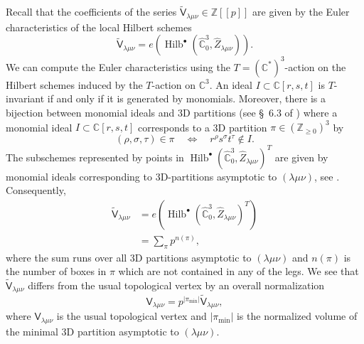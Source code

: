 \documentclass[12pt]{amsart}
\theoremstyle{definition}
\newcommand{\CC} {\mathbb{C}}          %
\newcommand{\ZZ} {\mathbb{Z}}		%
\newcommand{\sfV}{\mathsf{V}}
\newcommand{\sfVtilde}{\widetilde{\mathsf{V}}}
\newcommand{\Hilb}{\operatorname{Hilb}}
\renewcommand{\hat}{\widehat}
\begin{document}
Recall that the coefficients of the series $\sfVtilde_{\lambda \mu \nu}\in \ZZ [[p]]$ are
given by the Euler characteristics of the local Hilbert schemes
\[
\sfVtilde_{\lambda \mu \nu} =
e\left(\Hilb^{\bullet}(\hat{\CC}^{3}_{0},\hat{Z}_{\lambda \mu \nu})
\right). 
\]
We can compute the Euler characteristics using the $T=(\CC^{*})^{3}$-action on the Hilbert schemes induced by the $T$-action on
$\CC^{3}$. An ideal $I\subset \CC [r,s,t]$ is $T$-invariant if and
only if it is generated by monomials. Moreover, there is a bijection
between monomial ideals and 3D partitions (see \S~6.3 of
\cite{Bryan-Kool-Young}) where a monomial ideal $I\subset \CC[r,s,t]$
corresponds to a 3D partition $\pi \in \left(\ZZ_{\geq 0} \right)^{3}$
by
\[
(\rho ,\sigma ,\tau )\in \pi  \quad \Longleftrightarrow\quad 
r^{\rho}s^{\sigma}t^{\tau} \notin I.
\]
The subschemes represented by points in
$\Hilb^{\bullet}(\hat{\CC}^{3}_{0},\hat{Z}_{\lambda \mu \nu}
)^{T}$ are given by monomial ideals corresponding to 3D-partitions
asymptotic to $(\lambda \mu \nu )$, see
\cite[Defn~1]{Bryan-Kool-Young}. Consequently, 
\begin{align*}
\sfVtilde_{\lambda \mu \nu}& = e\left(\Hilb^{\bullet}(\hat{\CC}^{3}_{0},\hat{Z}_{\lambda \mu \nu} )^{T}\right)\\
&=\sum_{\pi} p^{n(\pi )},
\end{align*}
where the sum runs over all 3D partitions asymptotic to $(\lambda \mu
\nu )$ and $n(\pi )$ is the number of boxes in $\pi$ which are not
contained in any of the legs. We see that $\sfVtilde_{\lambda \mu
\nu}$ differs from the usual topological vertex by an overall
normalization
\[
\sfV_{\lambda \mu \nu} = p^{|\pi_{\min}|} \sfVtilde_{\lambda \mu \nu},
\]
where $\sfV_{\lambda \mu \nu }$ is the usual topological vertex
\cite[Defn~2]{Bryan-Kool-Young} and $|\pi_{\min}|$ is the normalized
volume of the minimal 3D partition asymptotic to $(\lambda \mu \nu )$.  
\end{document}
